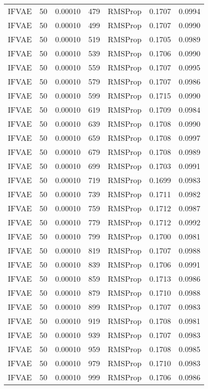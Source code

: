 \begin{tabular}{llrllrr}
   IFVAE &   50 &  0.00010 &   479 &   RMSProp &  0.1707 &       0.0994 \\
   IFVAE &   50 &  0.00010 &   499 &   RMSProp &  0.1707 &       0.0990 \\
   IFVAE &   50 &  0.00010 &   519 &   RMSProp &  0.1705 &       0.0989 \\
   IFVAE &   50 &  0.00010 &   539 &   RMSProp &  0.1706 &       0.0990 \\
   IFVAE &   50 &  0.00010 &   559 &   RMSProp &  0.1707 &       0.0995 \\
   IFVAE &   50 &  0.00010 &   579 &   RMSProp &  0.1707 &       0.0986 \\
   IFVAE &   50 &  0.00010 &   599 &   RMSProp &  0.1715 &       0.0990 \\
   IFVAE &   50 &  0.00010 &   619 &   RMSProp &  0.1709 &       0.0984 \\
   IFVAE &   50 &  0.00010 &   639 &   RMSProp &  0.1708 &       0.0990 \\
   IFVAE &   50 &  0.00010 &   659 &   RMSProp &  0.1708 &       0.0997 \\
   IFVAE &   50 &  0.00010 &   679 &   RMSProp &  0.1708 &       0.0989 \\
   IFVAE &   50 &  0.00010 &   699 &   RMSProp &  0.1703 &       0.0991 \\
   IFVAE &   50 &  0.00010 &   719 &   RMSProp &  0.1699 &       0.0983 \\
   IFVAE &   50 &  0.00010 &   739 &   RMSProp &  0.1711 &       0.0982 \\
   IFVAE &   50 &  0.00010 &   759 &   RMSProp &  0.1712 &       0.0987 \\
   IFVAE &   50 &  0.00010 &   779 &   RMSProp &  0.1712 &       0.0992 \\
   IFVAE &   50 &  0.00010 &   799 &   RMSProp &  0.1700 &       0.0981 \\
   IFVAE &   50 &  0.00010 &   819 &   RMSProp &  0.1707 &       0.0988 \\
   IFVAE &   50 &  0.00010 &   839 &   RMSProp &  0.1706 &       0.0991 \\
   IFVAE &   50 &  0.00010 &   859 &   RMSProp &  0.1713 &       0.0986 \\
   IFVAE &   50 &  0.00010 &   879 &   RMSProp &  0.1710 &       0.0988 \\
   IFVAE &   50 &  0.00010 &   899 &   RMSProp &  0.1707 &       0.0983 \\
   IFVAE &   50 &  0.00010 &   919 &   RMSProp &  0.1708 &       0.0981 \\
   IFVAE &   50 &  0.00010 &   939 &   RMSProp &  0.1707 &       0.0983 \\
   IFVAE &   50 &  0.00010 &   959 &   RMSProp &  0.1708 &       0.0985 \\
   IFVAE &   50 &  0.00010 &   979 &   RMSProp &  0.1710 &       0.0983 \\
   IFVAE &   50 &  0.00010 &   999 &   RMSProp &  0.1706 &       0.0986 \\
\bottomrule
\end{tabular}
